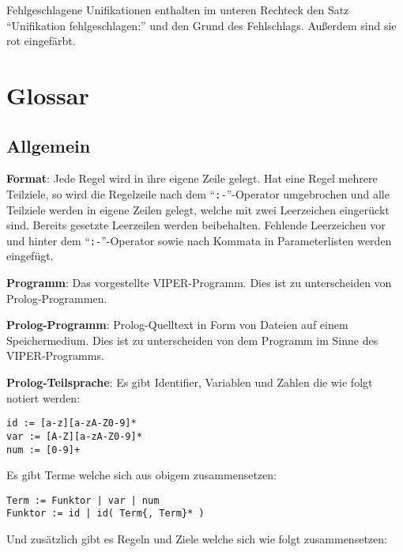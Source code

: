 \documentclass[parskip=full,11pt,twoside]{scrartcl}
\begin{document}
\begin{minipage}{\linewidth}
\end{minipage}

Fehlgeschlagene Unifikationen enthalten im unteren Rechteck den Satz \enquote{Unifikation fehlgeschlagen:} und den Grund des Fehlschlags.
Außerdem sind sie rot eingefärbt.

\section{Glossar}

\subsection{Allgemein}

\textbf{Format}:
Jede Regel wird in ihre eigene Zeile gelegt. Hat eine Regel mehrere Teilziele, so wird die Regelzeile nach dem \enquote{\texttt{:-}}-Operator umgebrochen und alle Teilziele werden in eigene Zeilen gelegt, welche mit zwei Leerzeichen eingerückt sind. Bereits gesetzte Leerzeilen werden beibehalten. Fehlende Leerzeichen vor und hinter dem \enquote{\texttt{:-}}-Operator sowie nach Kommata in Parameterlisten werden eingefügt.

\textbf{Programm}:
Das vorgestellte VIPER-Programm. Dies ist zu unterscheiden von Prolog-Programmen.

\textbf{Prolog-Programm}:
Prolog-Quelltext in Form von Dateien auf einem Speichermedium. Dies ist zu unterscheiden von dem Programm im Sinne des VIPER-Programms.

\textbf{Prolog-Teilsprache}:
Es gibt Identifier, Variablen und Zahlen die wie folgt notiert werden:

\begin{lstlisting}
id := [a-z][a-zA-Z0-9]*
var := [A-Z][a-zA-Z0-9]*
num := [0-9]+
\end{lstlisting}

Es gibt Terme welche sich aus obigem zusammensetzen:

\begin{lstlisting}
Term := Funktor | var | num
Funktor := id | id( Term{, Term}* )
\end{lstlisting}

Und zusätzlich gibt es Regeln und Ziele welche sich wie folgt zusammensetzen:
\end{document}
